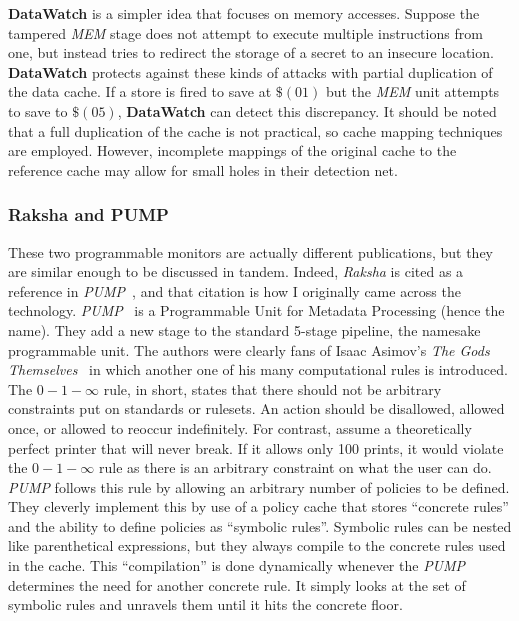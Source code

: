 \documentclass[sigconf,usenames,dvipsnames,svgnames,table]{acmart}
\begin{document}
        \textbf{DataWatch} is a simpler idea that focuses on memory accesses.
        Suppose the tampered \textit{MEM} stage does not attempt to execute multiple instructions from one, but instead tries to redirect the storage of a secret to an insecure location.
        \textbf{DataWatch} protects against these kinds of attacks with partial duplication of the data cache.
        If a store is fired to save at $\$(01)$ but the \textit{MEM} unit attempts to save to $\$(05)$, \textbf{DataWatch} can detect this discrepancy.
        It should be noted that a full duplication of the cache is not practical, so cache mapping techniques are employed.
        However, incomplete mappings of the original cache to the reference cache may allow for small holes in their detection net.

      \subsubsection{Raksha and PUMP}\label{sec:prior:runtime:RP}
        These two programmable monitors are actually different publications, but they are similar enough to be discussed in tandem.
        Indeed, \textit{Raksha} is cited as a reference in \textit{PUMP}~\cite{2014pump, 2015pumpupol}, and that citation is how I originally came across the technology.
        \textit{PUMP}~\cite{2014pump} is a Programmable Unit for Metadata Processing (hence the name).
        They add a new stage to the standard 5-stage pipeline, the namesake programmable unit.
        The authors were clearly fans of Isaac Asimov's \textit{The Gods Themselves}~\cite{1972tgt} in which another one of his many computational rules is introduced.
        The $0-1-\infty$ rule, in short, states that there should not be arbitrary constraints put on standards or rulesets.
        An action should be disallowed, allowed once, or allowed to reoccur indefinitely.
        For contrast, assume a theoretically perfect printer that will never break.
        If it allows only 100 prints, it would violate the $0-1-\infty$ rule as there is an arbitrary constraint on what the user can do.
        \textit{PUMP} follows this rule by allowing an arbitrary number of policies to be defined.
        They cleverly implement this by use of a policy cache that stores ``concrete rules'' and the ability to define policies as ``symbolic rules''.
        Symbolic rules can be nested like parenthetical expressions, but they always compile to the concrete rules used in the cache.
        This ``compilation'' is done dynamically whenever the \textit{PUMP} determines the need for another concrete rule.
        It simply looks at the set of symbolic rules and unravels them until it hits the concrete floor.
        \par
\end{document}
